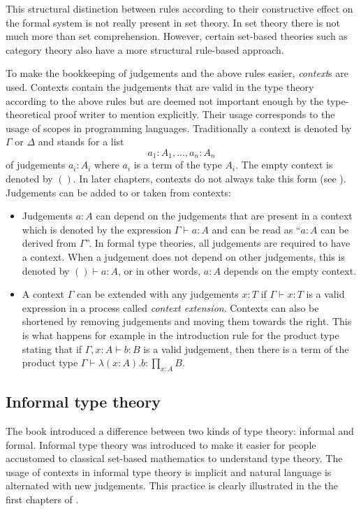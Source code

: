 \documentclass[12pt,a4paper,twoside,xetex]{book} %
\newcommand{\keyword}[1]{\emph{#1}\index{#1}}
\begin{document}
This structural distinction between rules according to their 
constructive effect on the formal system is not really present in set theory. In 
set theory there is not much more than set comprehension. However, certain 
set-based theories such as category theory also have a more structural 
rule-based approach. 

To make the bookkeeping of judgements and the above  rules easier, 
\keyword{context}s are used. Contexts contain the judgements that are valid in 
the type theory according to the above rules but are deemed not 
important enough by the type-theoretical proof writer to mention explicitly. 
Their usage corresponds to the usage of scopes in programming languages. 
Traditionally a context is denoted by $\Gamma$ or $\Delta$ and stands for a list 
$$a_1:A_1,...,a_n:A_n$$ of judgements $a_i : A_i$ where $a_i$ is a term of the type 
$A_i$.  The empty context is denoted by $()$. In later chapters, contexts do not 
always take this form (see ). Judgements can be added to 
or taken from contexts:

\begin{itemize}
\item Judgements $a : A$ can depend on the judgements that are present in a 
context which is denoted by the expression $\Gamma \vdash a : A$ and can be read as ``$a:A$ can be derived from $\Gamma$''. In formal 
type theories, all judgements are required to have a context. When a judgement 
does not depend on other judgements, this is denoted by $() \vdash a : A$, or 
in other words, $a : A$ depends on the empty context.  
\item A context $\Gamma$ can be extended with any judgements $x:T$ if $\Gamma 
\vdash x : T$ is a valid expression in a process called \keyword{context 
extension}. Contexts can also be shortened by removing judgements and moving them 
towards the right. This is what happens for example in the introduction rule for 
the product type stating that if $\Gamma , x : A \vdash b : B$ is a valid 
judgement, then there is a term of the product type $\Gamma \vdash \lambda (x : 
A) . b : \prod_{x : A} B$.
\end{itemize}




\subsection{Informal type theory}\label{informal}

The book \cite{Voevodsky2013} introduced a difference between two kinds of type 
theory: informal and formal. Informal type theory was introduced to make it 
easier for people accustomed to classical set-based mathematics to understand 
type theory. The usage of contexts in informal type theory is implicit and 
natural language is alternated with new judgements. This practice is clearly 
illustrated in the the first chapters of \cite{Voevodsky2013}.
\end{document}
